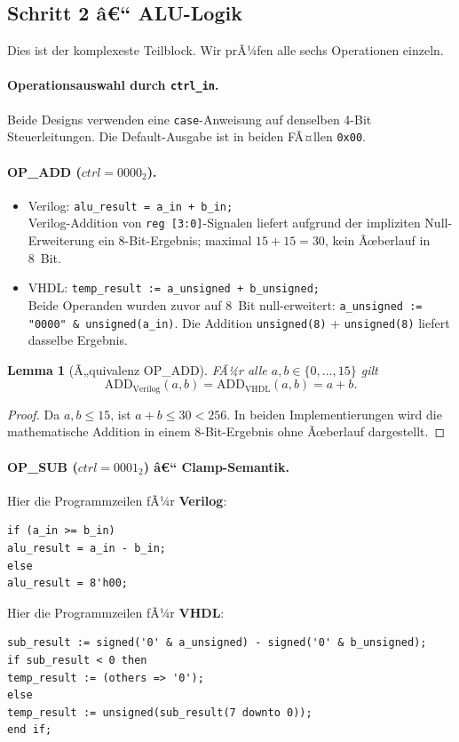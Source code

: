 ﻿\documentclass[12pt,a4paper]{report}
\newtheorem{lemma}[theorem]{Lemma}
\begin{document}
\subsection{Schritt 2 â€“ ALU-Logik}
\label{sssec:alu_logik}

Dies ist der komplexeste Teilblock.  Wir prÃ¼fen alle sechs Operationen einzeln.

\paragraph{Operationsauswahl durch \texttt{ctrl\_in}.}
Beide Designs verwenden eine \texttt{case}-Anweisung auf denselben 4-Bit
Steuerleitungen.  Die Default-Ausgabe ist in beiden FÃ¤llen \texttt{0x00}.

\paragraph{OP\_ADD ($ctrl = 0000_2$).}
\begin{itemize}
	\item Verilog: \quad\texttt{alu\_result = a\_in + b\_in;}\\
	Verilog-Addition von \texttt{reg [3:0]}-Signalen liefert aufgrund der
	impliziten Null-Erwei\-terung ein 8-Bit-Ergebnis; maximal $15+15=30$, kein
	Ãœberlauf in 8~Bit.
	\item VHDL: \quad\texttt{temp\_result := a\_unsigned + b\_unsigned;}\\
	Beide Operanden wurden zuvor auf 8~Bit null-erweitert:
	\texttt{a\_unsigned := "0000" \& unsigned(a\_in)}.  Die Addition
	\texttt{unsigned(8)} + \texttt{unsigned(8)} liefert dasselbe Ergebnis.
\end{itemize}

\begin{lemma}[Ã„quivalenz OP\_ADD]
	FÃ¼r alle $a,b \in \{0,\ldots,15\}$ gilt
	\[
	\mathrm{ADD}_\mathrm{Verilog}(a,b) = \mathrm{ADD}_\mathrm{VHDL}(a,b) = a + b.
	\]
\end{lemma}
\begin{proof}
	Da $a, b \leq 15$, ist $a + b \leq 30 < 256$.  In beiden Implementierungen
	wird die mathematische Addition in einem 8-Bit-Ergebnis ohne Ãœberlauf
	dargestellt.
\end{proof}

\paragraph{OP\_SUB ($ctrl = 0001_2$) â€“ Clamp-Semantik.}
Hier die Programmzeilen fÃ¼r \textbf{Verilog}:
\begin{lstlisting}[style=hdlstyle]
if (a_in >= b_in)
alu_result = a_in - b_in;
else
alu_result = 8'h00;
\end{lstlisting}
Hier die Programmzeilen fÃ¼r \textbf{VHDL}:
\begin{lstlisting}[style=hdlstyle]
sub_result := signed('0' & a_unsigned) - signed('0' & b_unsigned);
if sub_result < 0 then
temp_result := (others => '0');
else
temp_result := unsigned(sub_result(7 downto 0));
end if;
\end{lstlisting}
\end{document}
